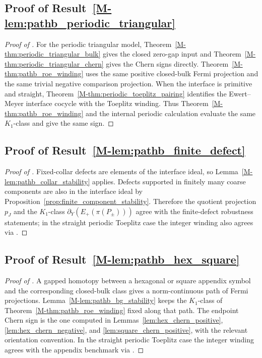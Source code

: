 \documentclass[11pt]{article}
\numberwithin{equation}{section}
\theoremstyle{definition}
\theoremstyle{remark}
\begin{document}
\subsection{Proof of Result~\ref{M-lem:pathb_periodic_triangular}}\label{app:proof:lem:pathb_periodic_triangular}
\begin{proof}[Proof of ]
For the periodic triangular model, Theorem~\ref{M-thm:periodic_triangular_bulk} gives the closed
zero-gap input and Theorem~\ref{M-thm:periodic_triangular_chern} gives the Chern signs directly.
Theorem~\ref{M-thm:pathb_roe_winding} uses the same positive closed-bulk Fermi projection and the
same trivial negative comparison projection. When the interface is primitive and straight,
Theorem~\ref{M-thm:periodic_toeplitz_pairing} identifies the Ewert--Meyer interface cocycle with the
Toeplitz winding. Thus Theorem~\ref{M-thm:pathb_roe_winding} and the internal periodic calculation
evaluate the same \(K_1\)-class and give the same sign.
\end{proof}

\subsection{Proof of Result~\ref{M-lem:pathb_finite_defect}}\label{app:proof:lem:pathb_finite_defect}
\begin{proof}[Proof of ]
Fixed-collar defects are elements of the interface ideal, so
Lemma~\ref{M-lem:pathb_collar_stability} applies. Defects supported in finitely many coarse
components are also in the interface ideal by Proposition~\ref{prop:finite_component_stability}.
Therefore the quotient projection \(p_J\) and the \(K_1\)-class
\(\partial_Y(E_+(\pi(P_\pm)))\) agree with the finite-defect robustness statements; in the
straight periodic Toeplitz case the integer winding also agrees via
.
\end{proof}

\subsection{Proof of Result~\ref{M-lem:pathb_hex_square}}\label{app:proof:lem:pathb_hex_square}
\begin{proof}[Proof of ]
A gapped homotopy between a hexagonal or square appendix symbol and the corresponding closed-bulk
class gives a norm-continuous path of Fermi projections. Lemma~\ref{M-lem:pathb_bg_stability} keeps
the \(K_1\)-class of Theorem~\ref{M-thm:pathb_roe_winding} fixed along that path. The endpoint
Chern sign is the one computed in Lemmas~\ref{lem:hex_chern_positive}, \ref{lem:hex_chern_negative},
and \ref{lem:square_chern_positive}, with the relevant orientation convention. In the
straight periodic Toeplitz case the integer winding agrees with the appendix benchmark via
.
\end{proof}
\end{document}

